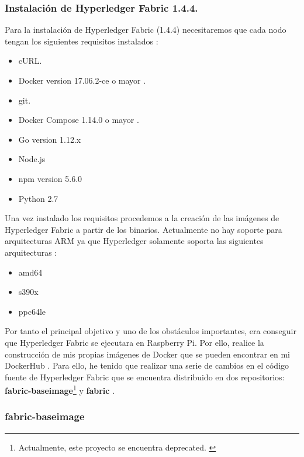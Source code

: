 \newpage

\subsubsection*{Instalación de Hyperledger Fabric 1.4.4.}

Para la instalación de Hyperledger Fabric (1.4.4) necesitaremos que cada nodo tengan los siguientes requisitos instalados 
\cite{hyperledger-fabric-docs}:

\begin{itemize}
  \item cURL.
  \item Docker version 17.06.2-ce o mayor \cite{install-docker-rasp, set-up-docker-rasp}.
  \item git.
  \item Docker Compose 1.14.0 o mayor \cite{install-docker-rasp, set-up-docker-rasp}.
  \item Go version 1.12.x
  \item Node.js
  \item npm version 5.6.0
  \item Python 2.7
\end{itemize}

\noindent Una vez instalado los requisitos procedemos a la creación de las imágenes de Hyperledger Fabric a partir de 
los binarios. Actualmente no hay soporte para arquitecturas ARM ya que Hyperledger solamente soporta las siguientes 
arquitecturas \cite{build-docker-images}:

\begin{itemize}
  \item amd64
  \item s390x
  \item ppc64le
\end{itemize}

\noindent Por tanto el principal objetivo y uno de los obstáculos importantes, era conseguir que Hyperledger Fabric 
se ejecutara en Raspberry Pi. Por ello, realice la construcción de mis propias imágenes de Docker que se pueden 
encontrar en mi DockerHub \cite{dockerhub}. Para ello, he tenido que realizar una serie de cambios en el código fuente
de Hyperledger Fabric que se encuentra distribuido en dos repositorios: \textbf{fabric-baseimage}\footnote{Actualmente, 
este proyecto se encuentra deprecated. \label{fnlabel}} y \textbf{fabric} \cite{fabric-baseimage, fabric}. 

\subsubsection*{fabric-baseimage}

